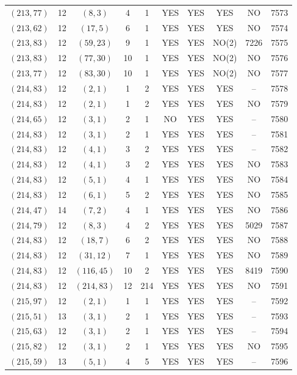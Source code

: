 \begin{longtable}{|c|c|c|c|c|c|c|c|c|c|}
$(213, 77)$ & 12 & $(8, 3)$ & 4 & 1 & YES & YES & YES & NO & 7573\\
$(213, 62)$ & 12 & $(17, 5)$ & 6 & 1 & YES & YES & YES & NO & 7574\\
$(213, 83)$ & 12 & $(59, 23)$ & 9 & 1 & YES & YES & NO(2) & 7226 & 7575\\
$(213, 83)$ & 12 & $(77, 30)$ & 10 & 1 & YES & YES & NO(2) & NO & 7576\\
$(213, 77)$ & 12 & $(83, 30)$ & 10 & 1 & YES & YES & NO(2) & NO & 7577\\
$(214, 83)$ & 12 & $(2, 1)$ & 1 & 2 & YES & YES & YES & -- & 7578\\
$(214, 83)$ & 12 & $(2, 1)$ & 1 & 2 & YES & YES & YES & NO & 7579\\
$(214, 65)$ & 12 & $(3, 1)$ & 2 & 1 & NO & YES & YES & -- & 7580\\
$(214, 83)$ & 12 & $(3, 1)$ & 2 & 1 & YES & YES & YES & -- & 7581\\
$(214, 83)$ & 12 & $(4, 1)$ & 3 & 2 & YES & YES & YES & -- & 7582\\
$(214, 83)$ & 12 & $(4, 1)$ & 3 & 2 & YES & YES & YES & NO & 7583\\
$(214, 83)$ & 12 & $(5, 1)$ & 4 & 1 & YES & YES & YES & NO & 7584\\
$(214, 83)$ & 12 & $(6, 1)$ & 5 & 2 & YES & YES & YES & NO & 7585\\
$(214, 47)$ & 14 & $(7, 2)$ & 4 & 1 & YES & YES & YES & NO & 7586\\
$(214, 79)$ & 12 & $(8, 3)$ & 4 & 2 & YES & YES & YES & 5029 & 7587\\
$(214, 83)$ & 12 & $(18, 7)$ & 6 & 2 & YES & YES & YES & NO & 7588\\
$(214, 83)$ & 12 & $(31, 12)$ & 7 & 1 & YES & YES & YES & NO & 7589\\
$(214, 83)$ & 12 & $(116, 45)$ & 10 & 2 & YES & YES & YES & 8419 & 7590\\
$(214, 83)$ & 12 & $(214, 83)$ & 12 & 214 & YES & YES & YES & NO & 7591\\
$(215, 97)$ & 12 & $(2, 1)$ & 1 & 1 & YES & YES & YES & -- & 7592\\
$(215, 51)$ & 13 & $(3, 1)$ & 2 & 1 & YES & YES & YES & -- & 7593\\
$(215, 63)$ & 12 & $(3, 1)$ & 2 & 1 & YES & YES & YES & -- & 7594\\
$(215, 82)$ & 12 & $(3, 1)$ & 2 & 1 & YES & YES & YES & NO & 7595\\
$(215, 59)$ & 13 & $(5, 1)$ & 4 & 5 & YES & YES & YES & -- & 7596\\

\end{longtable}
